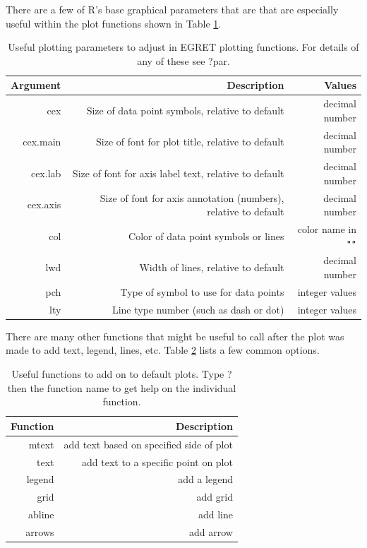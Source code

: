 \documentclass[a4paper,11pt]{article}\usepackage[]{graphicx}\usepackage[]{color}
\begin{document}
There are a few of R's base graphical parameters that are that are especially useful within the plot functions shown in Table \ref{table:tableChangeSingle}.

\begin{table}[ht]
\centering
\begin{tabular}{rrr}
  \hline
Argument & Description & Values  \\ 
  \hline
cex &  Size of data point symbols, relative to default & decimal number \\ 
cex.main & Size of font for plot title, relative to default & decimal number \\ 
cex.lab &  Size of font for axis label text, relative to default & decimal number \\ 
cex.axis & Size of font for axis annotation (numbers), relative to default & decimal number\\
col & Color of data point symbols or lines & color name in \texttt{"}\texttt{"} \\
lwd & Width of lines, relative to default & decimal number\\
pch & Type of symbol to use for data points & integer values\\
lty & Line type number (such as dash or dot) & integer values\\
   \hline
\end{tabular}
\caption{Useful plotting parameters to adjust in EGRET plotting functions.  For details of any of these see ?par.} 
\label{table:tableChangeSingle}
\end{table}

There are many other functions that might be useful to call after the plot was made to add text, legend, lines, etc. Table \ref{table:addOns} lists a few common options.

\begin{table}[ht]
\centering
\begin{tabular}{rr}
  \hline
Function & Description  \\ 
  \hline
mtext & add text based on specified side of plot\\
text & add text to a specific point on plot\\
legend & add a legend \\ 
grid & add grid\\ 
abline & add line \\
arrows & add arrow \\ 
   \hline
\end{tabular}
\caption{Useful functions to add on to default plots. Type ? then the function name to get help on the individual function.} 
\label{table:addOns}
\end{table}
\end{document}
